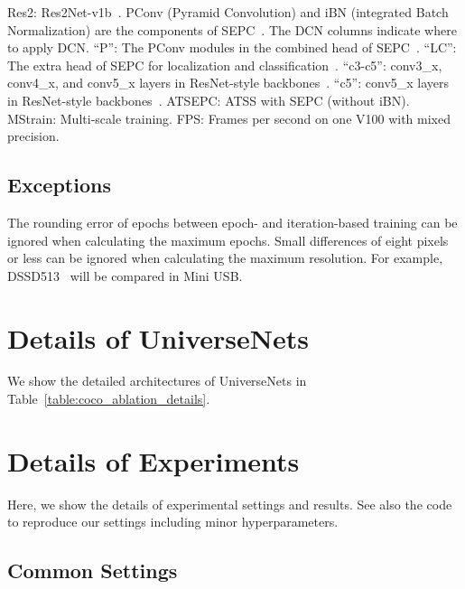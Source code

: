 \documentclass[10pt,twocolumn,letterpaper]{article}
\newcommand{\Univs}{UniverseNets\xspace}
\newcommand{\ATSEPC}{ATSEPC\xspace}
\begin{document}
\begin{table*}[t]
{    Res2: Res2Net-v1b~\cite{Res2Net_TPAMI2020, Res2Net_PretrainedModels}.
    PConv (Pyramid Convolution) and iBN (integrated Batch Normalization) are the components of SEPC~\cite{SEPC_CVPR2020}.
    The DCN columns indicate where to apply DCN.
    ``P'': The PConv modules in the combined head of SEPC~\cite{SEPC_CVPR2020}.
    ``LC'': The extra head of SEPC for localization and classification~\cite{SEPC_CVPR2020}.
    ``c3-c5'': conv3\_x, conv4\_x, and conv5\_x layers in ResNet-style backbones~\cite{ResNet_CVPR2016}.
    ``c5'': conv5\_x layers in ResNet-style backbones~\cite{ResNet_CVPR2016}.
	\ATSEPC: ATSS with SEPC (without iBN).
	MStrain: Multi-scale training.
	FPS: Frames per second on one V100 with mixed precision.
}
\label{table:coco_ablation_details}
\end{table*}






\subsection{Exceptions}

The rounding error of epochs between epoch- and iteration-based training can be ignored when calculating the maximum epochs.
Small differences of eight pixels or less can be ignored when calculating the maximum resolution.
For example, DSSD513~\cite{DSSD_2017} will be compared in Mini USB.



\section{Details of \Univs}

We show the detailed architectures of \Univs
in Table~\ref{table:coco_ablation_details}.






\section{Details of Experiments}

Here, we show the details of experimental settings and results.
See also the code to reproduce our settings including minor hyperparameters.

\subsection{Common Settings}
\end{document}
